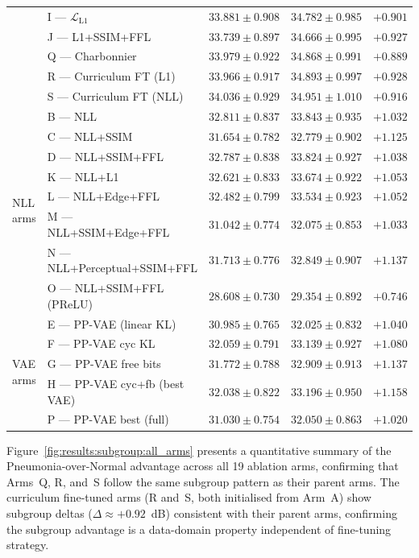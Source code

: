 \documentclass[12pt, a4paper, twoside, openright]{book}
\begin{document}
\begin{landscape}
\begin{longtable}{p{2.4cm}p{7.0cm}ccc}
  & I — $\mathcal{L}_{\mathrm{L1}}$    & $33.881\pm0.908$ & $34.782\pm0.985$ & $+0.901$ \\
  & J — L1+SSIM+FFL                   & $33.739\pm0.897$ & $34.666\pm0.995$ & $+0.927$ \\
  & Q — Charbonnier                    & $33.979\pm0.922$ & $34.868\pm0.991$ & $+0.889$ \\
  & R — Curriculum FT (L1)             & $33.966\pm0.917$ & $34.893\pm0.997$ & $+0.928$ \\
  & S — Curriculum FT (NLL)            & $34.036\pm0.929$ & $34.951\pm1.010$ & $+0.916$ \\
\midrule
\multirow{8}{*}{NLL arms}
  & B — NLL                            & $32.811\pm0.837$ & $33.843\pm0.935$ & $+1.032$ \\
  & C — NLL+SSIM                       & $31.654\pm0.782$ & $32.779\pm0.902$ & $+1.125$ \\
  & D — NLL+SSIM+FFL                   & $32.787\pm0.838$ & $33.824\pm0.927$ & $+1.038$ \\
  & K — NLL+L1                         & $32.621\pm0.833$ & $33.674\pm0.922$ & $+1.053$ \\
  & L — NLL+Edge+FFL                   & $32.482\pm0.799$ & $33.534\pm0.923$ & $+1.052$ \\
  & M — NLL+SSIM+Edge+FFL              & $31.042\pm0.774$ & $32.075\pm0.853$ & $+1.033$ \\
  & N — NLL+Perceptual+SSIM+FFL        & $31.713\pm0.776$ & $32.849\pm0.907$ & $+1.137$ \\
  & O — NLL+SSIM+FFL (PReLU)           & $28.608\pm0.730$ & $29.354\pm0.892$ & $+0.746$ \\
\midrule
\multirow{5}{*}{VAE arms}
  & E — PP-VAE (linear KL)             & $30.985\pm0.765$ & $32.025\pm0.832$ & $+1.040$ \\
  & F — PP-VAE cyc KL                  & $32.059\pm0.791$ & $33.139\pm0.927$ & $+1.080$ \\
  & G — PP-VAE free bits               & $31.772\pm0.788$ & $32.909\pm0.913$ & $+1.137$ \\
  & H — PP-VAE cyc+fb (best VAE)       & $32.038\pm0.822$ & $33.196\pm0.950$ & $+1.158$ \\
  & P — PP-VAE best (full)             & $31.030\pm0.754$ & $32.050\pm0.863$ & $+1.020$ \\
%
\end{longtable}
\end{landscape}

Figure~\ref{fig:results:subgroup:all_arms} presents a quantitative summary of the Pneumonia-over-Normal advantage across all 19 ablation arms, confirming that Arms~Q, R, and~S follow the same subgroup pattern as their parent arms. The curriculum fine-tuned arms (R and~S, both initialised from Arm~A) show subgroup deltas ($\Delta \approx +0.92$~dB) consistent with their parent arms, confirming the subgroup advantage is a data-domain property independent of fine-tuning strategy.
\end{document}
